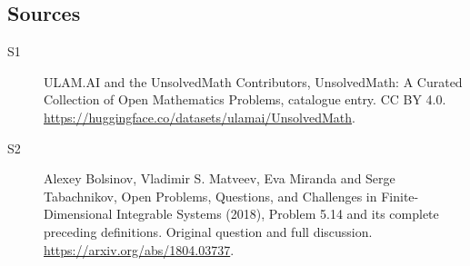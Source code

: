 \documentclass[11pt]{article}
\begin{document}
\subsection{Sources}
\begin{description}
\item[\hypertarget{source:statement:1}{S1}] ULAM.AI and the UnsolvedMath Contributors, UnsolvedMath: A Curated Collection of Open Mathematics Problems, catalogue entry. CC BY 4.0. \url{https://huggingface.co/datasets/ulamai/UnsolvedMath}.
\item[\hypertarget{source:statement:2}{S2}] Alexey Bolsinov, Vladimir S. Matveev, Eva Miranda and Serge Tabachnikov, Open Problems, Questions, and Challenges in Finite-Dimensional Integrable Systems (2018), Problem 5.14 and its complete preceding definitions. Original question and full discussion. \url{https://arxiv.org/abs/1804.03737}.

\end{description}
\label{end:statement}
\end{document}
